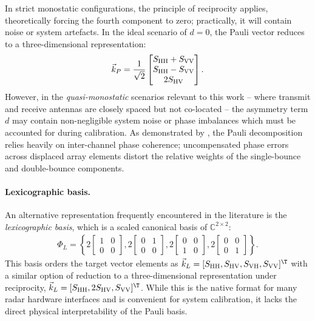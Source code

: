 In strict monostatic configurations, the principle of reciprocity applies, theoretically forcing the fourth component to zero; practically, it will contain noise or system artefacts.
In the ideal scenario of $d=0$, the Pauli vector reduces to a three-dimensional representation:
\begin{align}
    \label{eq:pauli-vector-3d}
    \vec k_P = \frac{1}{\sqrt{2}} \begin{bmatrix}
        S_{\mathrm{HH}} + S_{\mathrm{VV}} \\
        S_{\mathrm{HH}} - S_{\mathrm{VV}} \\
        2S_{\mathrm{HV}}
    \end{bmatrix}.
\end{align}
However, in the \emph{quasi-monostatic} scenarios relevant to this work -- where transmit and receive antennas are closely spaced but not co-located -- the asymmetry term $d$ may contain non-negligible system noise or phase imbalances which must be accounted for during calibration.
As demonstrated by \textcite{bouwmeesterClassificationDynamicVulnerable2025}, the Pauli decomposition relies heavily on inter-channel phase coherence; uncompensated phase errors across displaced array elements distort the relative weights of the single-bounce and double-bounce components.

\paragraph{Lexicographic basis.}
An alternative representation frequently encountered in the literature is the \emph{lexicographic basis}, which is a scaled canonical basis of $\mathbb{C}^{2 \times 2}$:
\begin{align}
    \label{eq:lexicographic-basis}
    \Phi_L = \left\{
        2\begin{bmatrix} 1 & 0 \\ 0 & 0 \end{bmatrix},
        2\begin{bmatrix} 0 & 1 \\ 0 & 0 \end{bmatrix},
        2\begin{bmatrix} 0 & 0 \\ 1 & 0 \end{bmatrix},
        2\begin{bmatrix} 0 & 0 \\ 0 & 1 \end{bmatrix}
    \right\}.
\end{align}
This basis orders the target vector elements as $\vec k_L = [S_\HH, S_\HV, S_\VH, S_\VV]^\T$ with a similar option of reduction to a three-dimensional representation under reciprocity, $\vec k_L = [S_\HH, 2S_\HV, S_\VV]^\T$.
While this is the native format for many radar hardware interfaces and is convenient for system calibration, it lacks the direct physical interpretability of the Pauli basis.


